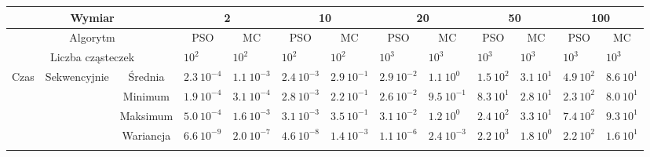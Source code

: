 \documentclass[11pt, a4paper, oneside]{article}
\begin{document}
\renewcommand{\arraystretch}{2}
\begin{table}[t]
\scriptsize
\begin{adjustwidth}{-1.76cm}{}
\centering
\begin{tabular}{|c|c|c|l|l|l|l|l|l|l|l|l|l|}
\hline
\multicolumn{3}{|c|}{Wymiar}                                      & \multicolumn{2}{c|}{2}                             & \multicolumn{2}{c|}{10}                            & \multicolumn{2}{c|}{20}                            & \multicolumn{2}{c|}{50}                            & \multicolumn{2}{c|}{100}                           \\ \hline
\multicolumn{3}{|c|}{Algorytm}                                    & \multicolumn{1}{c|}{PSO} & \multicolumn{1}{c|}{MC} & \multicolumn{1}{c|}{PSO} & \multicolumn{1}{c|}{MC} & \multicolumn{1}{c|}{PSO} & \multicolumn{1}{c|}{MC} & \multicolumn{1}{c|}{PSO} & \multicolumn{1}{c|}{MC} & \multicolumn{1}{c|}{PSO} & \multicolumn{1}{c|}{MC} \\ \hline
\multicolumn{3}{|c|}{Liczba cząsteczek}                           & $10^{2}$                 & $10^{2}$                & $10^{2}$                 & $10^{2}$                & $10^{3}$                 & $10^{3}$                & $10^{3}$                 & $10^{3}$                & $10^{3}$                 & $10^{3}$                \\ \hline
\multirow{8}{*}{Czas} & \multirow{4}{*}{Sekwencyjnie} & Średnia   & $2.3 \ 10^{-4}$          & $1.1 \ 10^{-3}$         & $2.4 \ 10^{-3}$          & $2.9 \ 10^{-1}$         & $2.9 \ 10^{-2}$          & $1.1 \ 10^{0}$          & $1.5 \ 10^{2}$           & $3.1 \ 10^{1}$          & $4.9 \ 10^{2}$           & $8.6 \ 10^{1}$          \\ \cline{3-13} 
                      &                               & Minimum   & $1.9 \ 10^{-4}$          & $3.1 \ 10^{-4}$         & $2.8 \ 10^{-3}$          & $2.2 \ 10^{-1}$         & $2.6 \ 10^{-2}$          & $9.5 \ 10^{-1}$         & $8.3 \ 10^{1}$           & $2.8 \ 10^{1}$          & $2.3 \ 10^{2}$           & $8.0 \ 10^{1}$          \\ \cline{3-13} 
                      &                               & Maksimum  & $5.0 \ 10^{-4}$          & $1.6 \ 10^{-3}$         & $3.1 \ 10^{-3}$          & $3.5 \ 10^{-1}$         & $3.1 \ 10^{-2}$          & $1.2 \ 10^{0}$          & $2.4 \ 10^{2}$           & $3.3 \ 10^{1}$          & $7.4 \ 10^{2}$           & $9.3 \ 10^{1}$          \\ \cline{3-13} 
                      &                               & Wariancja & $6.6 \ 10^{-9}$          & $2.0 \ 10^{-7}$         & $4.6 \ 10^{-8}$          & $1.4 \ 10^{-3}$         & $1.1 \ 10^{-6}$          & $2.4 \ 10^{-3}$         & $2.2 \ 10^{3}$           & $1.8 \ 10^{0}$          & $2.2 \ 10^{2}$           & $1.6 \ 10^{1}$          \\ \cline{2-13} 

\end{tabular}
\end{adjustwidth}
\end{table}
\end{document}
